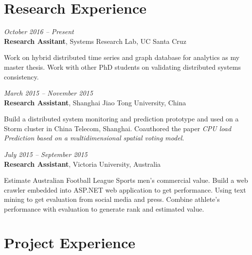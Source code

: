\documentclass[fontsize=10pt]{tccv}
\begin{document}
\section{Research Experience}

\begin{eventlist}

\textit{October 2016 -- Present}\\
\textbf{Research Assitant}, Systems Research Lab, UC Santa Cruz\smallskip

Work on hybrid distributed time series and graph database for analytics as my master thesis.
Work with other PhD students on validating distributed systems consistency.

\textit{March 2015 -- November 2015} \\
\textbf{Research Assistant}, Shanghai Jiao Tong University, China\smallskip

Build a distributed system monitoring and prediction prototype and used on a Storm cluster in China Telecom, Shanghai.
Coauthored the paper \textit{CPU load Prediction based on a multidimensional spatial voting model}.

\medskip


\textit{July 2015 -- September 2015} \\
\textbf{Research Assistant}, Victoria University, Australia\smallskip

Estimate Australian Football League Sports men's commercial value.
Build a web crawler embedded into ASP.NET web application to get performance.
Using text mining to get evaluation from social media and press.
Combine athlete's performance with evaluation to generate rank and estimated value.

\end{eventlist}

\section{Project Experience}
\end{document}
